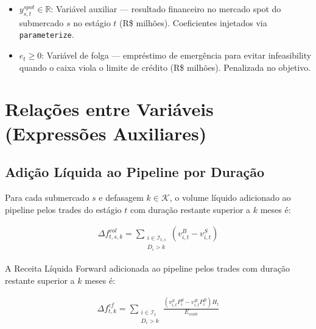 \documentclass{article}
\begin{document}
\begin{itemize}
    \item $y^{spot}_{s,t} \in \mathbb{R}$: Variável auxiliar — resultado financeiro no mercado
    spot do submercado $s$ no estágio $t$ (R\$ milhões). Coeficientes injetados via
    \texttt{parameterize}.

    \item $e_t \geq 0$: Variável de folga — empréstimo de emergência para evitar infeasibility
    quando o caixa viola o limite de crédito (R\$ milhões). Penalizada no objetivo.

\end{itemize}

\section{Relações entre Variáveis (Expressões Auxiliares)}

\subsection{Adição Líquida ao Pipeline por Duração}

Para cada submercado $s$ e defasagem $k \in \mathcal{K}$, o volume líquido adicionado ao
pipeline pelos trades do estágio $t$ com duração restante superior a $k$ meses é:

\begin{align}
    \Delta f^{vol}_{t,s,k} =
    \sum_{\substack{i \in \mathcal{I}_{t,s} \\ D_i > k}}
    \left( v^{B}_{i,t} - v^{S}_{i,t} \right)
\end{align}

A Receita Líquida Forward adicionada ao pipeline pelos trades com duração restante superior
a $k$ meses é:

\begin{align}
    \Delta f^{cf}_{t,k} =
    \sum_{\substack{i \in \mathcal{I}_{t} \\ D_i > k}}
    \frac{\left( v^{S}_{i,t} P^{S}_{i} - v^{B}_{i,t} P^{B}_{i} \right) H_t}{E_{scale}}
\end{align}
\end{document}
